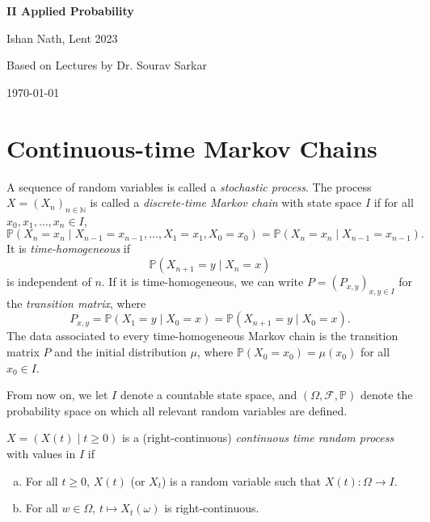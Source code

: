 \documentclass[12pt]{article}
\begin{document}
\hypersetup{pageanchor=false}
\begin{titlepage}
	\begin{center}
		\vspace*{1em}
		\Huge
		\textbf{II Applied Probability}

		\vspace{1em}
		\large
		Ishan Nath, Lent 2023

		\vspace{1.5em}

		\Large

		Based on Lectures by Dr. Sourav Sarkar

		\vspace{1em}

		\large
		\today
	\end{center}
	
\end{titlepage}
\hypersetup{pageanchor=true}

\tableofcontents

\newpage

\section{Continuous-time Markov Chains}
\label{sec:continuous_time_markov_chains}

A sequence of random variables is called a \emph{stochastic process}. The process $X = (X_n)_{n \in \mathbb{N}}$ is called a \emph{discrete-time Markov chain} with state space $I$ if for all $x_0, x_1, \ldots, x_n \in I$,
\[
\mathbb{P}(X_n = x_n \mid X_{n-1} = x_{n-1}, \ldots, X_1 = x_1, X_0 = x_0) = \mathbb{P}(X_n = x_n \mid X_{n-1} = x_{n-1})
.\]
It is \emph{time-homogeneous} if
\[
\mathbb{P}(X_{n+1} = y \mid X_n = x)
\]
is independent of $n$. If it is time-homogeneous, we can write $P = (P_{x,y})_{x, y \in I}$ for the \emph{transition matrix}, where
\[
P_{x,y} = \mathbb{P}(X_{1} = y \mid X_0 = x) = \mathbb{P}(X_{n+1} = y \mid X_0 = x)
.\]
The data associated to every time-homogeneous Markov chain is the transition matrix $P$ and the initial distribution $\mu$, where $\mathbb{P}(X_0 = x_0) = \mu(x_0)$ for all $x_0 \in I$.

From now on, we let $I$ denote a countable state space, and $(\Omega, \mathcal{F}, \mathbb{P})$ denote the probability space on which all relevant random variables are defined.

\begin{definition}
	$X = (X(t) \mid t \geq 0)$ is a (right-continuous) \emph{continuous time random process} with values in $I$ if
	\begin{enumerate}[(a)]
		\item For all $t \geq 0$, $X(t)$ (or $X_t$) is a random variable such that $X(t) : \Omega \to I$.
		\item For all $w \in \Omega$, $t \mapsto X_t(\omega)$ is right-continuous.
	\end{enumerate}
\end{definition}
\end{document}
